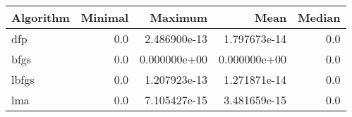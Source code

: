 \begin{tabular}{lrrrr}
\toprule
Algorithm &  Minimal &      Maximum &         Mean &  Median \\
\midrule
      dfp &      0.0 & 2.486900e-13 & 1.797673e-14 &     0.0 \\
     bfgs &      0.0 & 0.000000e+00 & 0.000000e+00 &     0.0 \\
    lbfgs &      0.0 & 1.207923e-13 & 1.271871e-14 &     0.0 \\
      lma &      0.0 & 7.105427e-15 & 3.481659e-15 &     0.0 \\
\bottomrule
\end{tabular}
